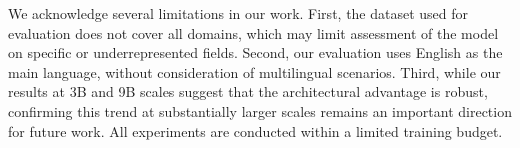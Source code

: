 We acknowledge several limitations in our work. First, the dataset used for evaluation does not cover all domains, which may limit assessment of the model on specific or underrepresented fields. Second, our evaluation uses English as the main language, without consideration of multilingual scenarios. Third, while our results at 3B and 9B scales suggest that the architectural advantage is robust, confirming this trend at substantially larger scales remains an important direction for future work. All experiments are conducted within a limited training budget.